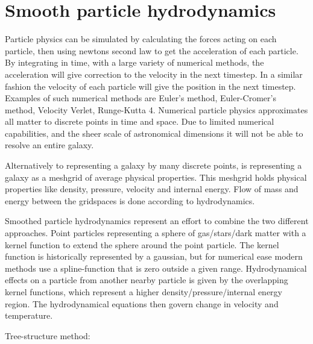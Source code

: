 
\iffalse

\section{Smooth particle hydrodynamics}

Particle physics can be simulated by calculating the forces acting on each particle, then using newtons second law to get the acceleration of each particle.
By integrating in time, with a large variety of numerical methods, the acceleration will give correction to the velocity in the next timestep.
In a similar fashion the velocity of each particle will give the position in the next timestep.
Examples of such numerical methods are Euler's method, Euler-Cromer's method, Velocity Verlet, Runge-Kutta 4.
Numerical particle physics approximates all matter to discrete points in time and space. Due to limited numerical capabilities, and the sheer scale of astronomical dimensions it will not be able to resolve an entire galaxy.

Alternatively to representing a galaxy by many discrete points, is representing a galaxy as a meshgrid of average physical properties.
This meshgrid holds physical properties like density, pressure, velocity and internal energy. Flow of mass and energy between the gridspaces is done according to hydrodynamics.

Smoothed particle hydrodynamics represent an effort to combine the two different approaches. Point particles representing a sphere of gas/stars/dark matter with a kernel function to extend the sphere around the point particle.
The kernel function is historically represented by a gaussian, but for numerical ease modern methods use a spline-function that is zero outside a given range.
Hydrodynamical effects on a particle from another nearby particle is given by the overlapping kernel functions, which represent a higher density/pressure/internal energy region. The hydrodynamical equations then govern change in velocity and temperature.

Tree-structure method:

